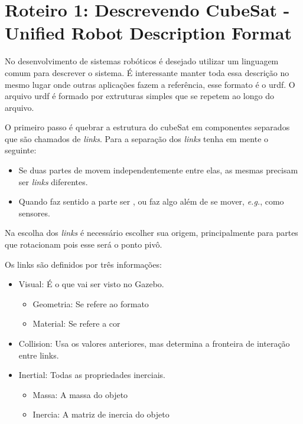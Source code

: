 \section{Roteiro 1: Descrevendo CubeSat - Unified Robot Description Format}

No desenvolvimento de sistemas robóticos é desejado utilizar um linguagem comum para descrever o sistema. É interessante manter toda essa descrição no mesmo lugar onde outras aplicações fazem a referência, esse formato é o urdf. O arquivo urdf é formado por extruturas simples que se repetem ao longo do arquivo.

O primeiro passo é quebrar a estrutura do cubeSat em componentes separados que são chamados de \textit{links}. Para a separação dos \textit{links} tenha em mente o seguinte:

\begin{itemize}
    \item Se duas partes de movem independentemente entre elas, as mesmas precisam ser \textit{links} diferentes.
    \item Quando faz sentido a parte ser , ou faz algo além de se mover, \textit{e.g.}, como sensores.
\end{itemize}

Na escolha dos \textit{links} é necessário escolher sua origem, principalmente para partes que rotacionam pois esse será o ponto pivô.

Os links são definidos por três informações:

\begin{itemize}
    \item Visual: É o que vai ser visto no Gazebo.
    \begin{itemize}
        \item Geometria: Se refere ao formato
        \item Material: Se refere a cor
    \end{itemize}
    \item Collision: Usa os valores anteriores, mas determina a fronteira de interação entre links. 
    \item Inertial: Todas as propriedades inerciais.
    \begin{itemize}
        \item Massa: A massa do objeto
        \item Inercia: A matriz de inercia do objeto
    \end{itemize}
\end{itemize}

